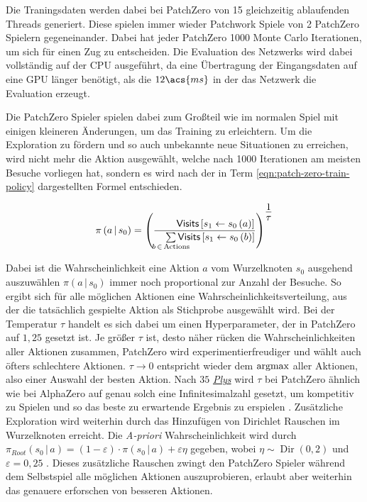 Die Traningsdaten werden dabei bei PatchZero von 15 gleichzeitig ablaufenden Threads generiert. Diese spielen immer wieder Patchwork Spiele von 2 PatchZero Spielern gegeneinander. Dabei hat jeder PatchZero 1000 Monte Carlo Iterationen, um sich für einen Zug zu entscheiden. Die Evaluation des Netzwerks wird dabei vollständig auf der \ac{CPU} ausgeführt, da eine Übertragung der Eingangsdaten auf eine \ac{GPU} länger benötigt, als die $12\acs{ms}$ in der das Netzwerk die Evaluation erzeugt.

Die PatchZero Spieler spielen dabei zum Großteil wie im normalen Spiel mit einigen kleineren Änderungen, um das Training zu erleichtern. Um die Exploration zu fördern und so auch unbekannte neue Situationen zu erreichen, wird nicht mehr die Aktion ausgewählt, welche nach 1000 Iterationen am meisten Besuche vorliegen hat, sondern es wird nach der in Term \ref{eqn:patch-zero-train-policy} dargestellten Formel entschieden.

\begin{align}
    \label{eqn:patch-zero-train-policy}
    \pi\left(a\,|\,s_0\right) = \left(\frac{\phantom{ab\sum} \mathsf{Visits}\left[s_1 \gets s_0\left(a\right) \right]}{\phantom{ab}\sum\limits_{\mathclap{b\, \in\, \text{Actions}}} \mathsf{Visits}\left[s_1 \gets s_0\left(b\right) \right]}\right)^{\text{\Large $\frac{1}{\tau}$}}
\end{align}

Dabei ist die Wahrscheinlichkeit eine Aktion $a$ vom Wurzelknoten $s_0$ ausgehend auszuwählen $\pi\left(a\,|\,s_0\right)$ immer noch proportional zur Anzahl der Besuche. So ergibt sich für alle möglichen Aktionen eine Wahrscheinlichkeitsverteilung, aus der die tatsächlich gespielte Aktion als Stichprobe ausgewählt wird. Bei der Temperatur $\tau$ handelt es sich dabei um einen Hyperparameter, der in PatchZero auf $1{,}25$ gesetzt ist. Je größer $\tau$ ist, desto näher rücken die Wahrscheinlichkeiten aller Aktionen zusammen, \dash PatchZero wird experimentierfreudiger und wählt auch öfters schlechtere Aktionen. $\tau \to 0$ entspricht wieder dem $\operatorname*{argmax}$ aller Aktionen, also einer Auswahl der besten Aktion. Nach $35$ \hyperref[text:ply]{\emph{Plys}} wird $\tau$ bei PatchZero ähnlich wie bei AlphaZero auf genau solch eine Infinitesimalzahl gesetzt, um kompetitiv zu Spielen und so das beste zu erwartende Ergebnis zu erspielen \cite[Anhang, S. 2]{2017.AlphaGoZeroPaper}. Zusätzliche Exploration wird weiterhin durch das Hinzufügen von Dirichlet Rauschen im Wurzelknoten erreicht. Die \emph{A-priori} Wahrscheinlichkeit wird durch $\pi_{Root}\left(s_0\,|\,a\right) = (1 - \varepsilon) \cdot \pi\left(s_0\,|\,a\right) + \varepsilon\eta$ gegeben, wobei $\eta \sim \operatorname{Dir}(0{,}2)$ und $\varepsilon = 0{,}25$ \cite[Anhang, S. 2]{2017.AlphaGoZeroPaper}. Dieses zusätzliche Rauschen zwingt den PatchZero Spieler während dem Selbstspiel alle möglichen Aktionen auszuprobieren, erlaubt aber weiterhin das genauere erforschen von besseren Aktionen.

